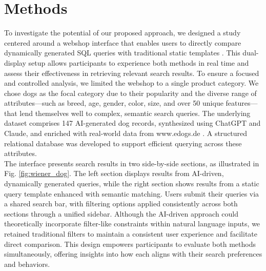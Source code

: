 \documentclass[../../submission.tex]{subfiles}
\begin{document}
\section{Methods}
To investigate the potential of our proposed approach, we designed a study centered around a webshop interface that enables users to directly 
compare dynamically generated SQL queries with traditional static templates \cite{jashniehParssaJHCIAI2025}. This dual-display setup allows participants to experience both 
methods in real time and assess their effectiveness in retrieving relevant search results. To ensure a focused and controlled analysis, we 
limited the webshop to a single product category. We chose dogs as the focal category due to their popularity and the diverse range of attributes—such as 
breed, age, gender, color, size, and over 50 unique features—that lend themselves well to complex, semantic search queries. The underlying dataset comprises 
147 AI-generated dog records, synthesized using ChatGPT and Claude, and enriched with real-world data from www.edogs.de \cite{edogsHundemarktHundeOnline}. A 
structured relational database was developed to support efficient querying across these attributes.\\
The interface presents search results in two side-by-side sections, as illustrated in Fig. \ref{fig:wiener_dog}. 
The left section displays results from AI-driven, dynamically generated queries, while the right section shows results 
from a static query template enhanced with semantic matching. Users submit their queries via a shared search bar, with 
filtering options applied consistently across both sections through a unified sidebar. Although the AI-driven approach could 
theoretically incorporate filter-like constraints within natural language inputs, we retained traditional filters to maintain 
a consistent user experience and facilitate direct comparison. This design empowers participants to evaluate both methods simultaneously, 
offering insights into how each aligns with their search preferences and behaviors.
\end{document}
